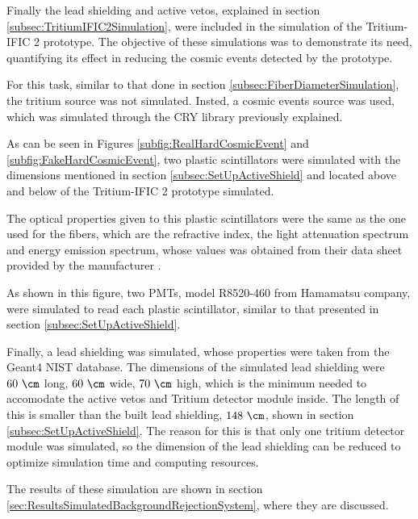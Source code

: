 Finally the lead shielding and active vetos, explained in section \ref{subsec:TritiumIFIC2Simulation}, were included in the simulation of the Tritium-IFIC 2 prototype. The objective of these simulations was to demonstrate its need, quantifying its effect in reducing the cosmic events detected by the prototype.

For this task, similar to that done in section \ref{subsec:FiberDiameterSimulation}, the tritium source was not simulated. Insted, a cosmic events source was used, which was simulated through the CRY library previously explained.

As can be seen in Figures \ref{subfig:RealHardCosmicEvent} and \ref{subfig:FakeHardCosmicEvent}, two plastic scintillators were simulated with the dimensions mentioned in section \ref{subsec:SetUpActiveShield} and located above and below of the Tritium-IFIC 2 prototype simulated. 

The optical properties given to this plastic scintillators were the same as the one used for the fibers, which are the refractive index, the light attenuation spectrum and energy emission spectrum, whose values was obtained from their data sheet provided by the manufacturer \cite{ScintillatorVeto}.

As shown in this figure, two PMTs, model R8520-460 from Hamamatsu company, were simulated to read each plastic scintillator, similar to that presented in section \ref{subsec:SetUpActiveShield}.

Finally, a lead shielding was simulated, whose properties were taken from the Geant4 NIST database. The dimensions of the simulated lead shielding were $60~\cm$ long, $60~\cm$ wide, $70~\cm$ high, which is the minimum needed to accomodate the active vetos and Tritium detector module inside.  The length of this is smaller than the built lead shielding, $148~\cm$, shown in section \ref{subsec:SetUpActiveShield}. The reason for this is that only one tritium detector module was simulated, so the dimension of the lead shielding can be reduced to optimize simulation time and computing resources.

The results of these simulation are shown in section \ref{sec:ResultsSimulatedBackgroundRejectionSystem}, where they are discussed.
